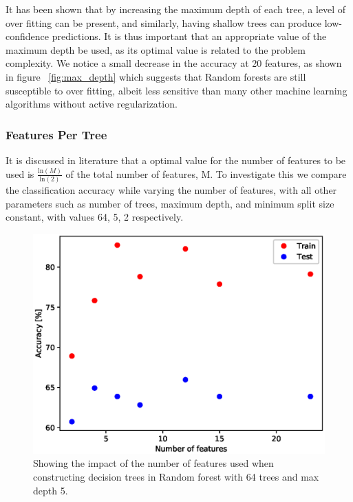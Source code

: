 \documentclass{article} %
\begin{document}
It has been shown that by increasing the maximum depth of each tree, a level of over fitting can be present, and similarly, having shallow trees can produce low-confidence predictions. \cite{Criminisi2011} It is thus important that an appropriate value of the maximum depth be used, as its optimal value is related to the problem complexity. We notice a small decrease in the accuracy at 20 features, as shown in figure ~\ref{fig:max_depth} which suggests that Random forests are still susceptible to over fitting, albeit less sensitive than many other machine learning algorithms without active regularization.

\subsubsection{Features Per Tree}

It is discussed in literature that a optimal value for the number of features to be used is $\frac{\text{ln}(M)}{\text{ln}(2)}$ of the total number of features, M. \cite{Brieman01} To investigate this we compare the classification accuracy while varying the number of features, with all other parameters such as number of trees, maximum depth, and minimum split size constant, with values 64, 5, 2 respectively. 

\begin{figure}[ht]
\begin{center}
\includegraphics[scale=0.4]{n_features}
\end{center}
\caption{Showing the impact of the number of features used when constructing decision trees in Random forest with 64 trees and max depth 5.}
\label{fig:n_features}
\end{figure}
\end{document}
